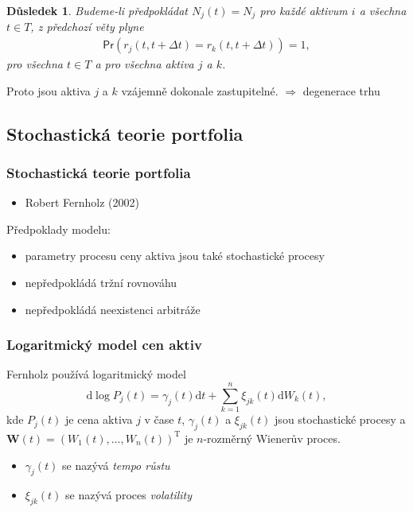 \documentclass[xcolor=dvipsnames]{beamer}
\newtheorem{dusledek}[veta]{Důsledek}
\theoremstyle{definition} \newtheorem{definice}[veta]{Definice}
\theoremstyle{remark}
\begin{document}
\begin{frame}
  \begin{dusledek}
 Budeme-li předpokládat $N_j(t)=N_j$ pro každé aktivum $i$ a všechna $t\in T$,
z předchozí věty plyne
  \begin{align*}
  \mathsf{Pr}\left(r_j(t,t+\Delta t)=r_k(t,t+\Delta t)\right)=1,
  \end{align*}
pro všechna $t\in T$ a pro všechna aktiva $j$ a $k$.
  \end{dusledek}
  
  \vspace{1cm}
Proto jsou aktiva $j$ a $k$ vzájemně dokonale zastupitelné. $\Rightarrow$  \textcolor{OliveGreen}{degenerace trhu}

\end{frame}

\subsection{Stochastická teorie portfolia}

\begin{frame}
  \frametitle{Stochastická teorie portfolia}
   \begin{itemize}
   \item Robert Fernholz (2002)   
   \end{itemize}                  \vspace{0.5cm}
 \textcolor{OliveGreen}{Předpoklady modelu:}
  \begin{itemize}
   \item parametry procesu ceny aktiva jsou také stochastické procesy
   \item nepředpokládá tržní rovnováhu
   \item nepředpokládá neexistenci arbitráže 
 \end{itemize}
\end{frame}

\begin{frame}
  \frametitle{Logaritmický model cen aktiv}
Fernholz používá logaritmický model
$$\mathrm{d}\log P_j(t)=\gamma_j(t)\mathrm{d}t+\sum_{k=1}^{n}\xi_{jk}(t)\mathrm{d}W_k(t),$$
kde $P_j(t)$ je cena aktiva $j$ v čase $t$, $\gamma_j(t)$ a $\xi_{jk}(t)$ jsou stochastické procesy a $\boldsymbol{W}(t)=(W_1(t),\dots,W_n(t))^\mathrm{T}$ je $n$-rozměrný Wienerův proces. 

\begin{itemize}
   \item  $\gamma_j(t)$ se nazývá \textit{tempo růstu}
   \item  $\xi_{jk}(t)$ se nazývá proces \textit{volatility} 
 \end{itemize}     
\end{frame}
\end{document}
